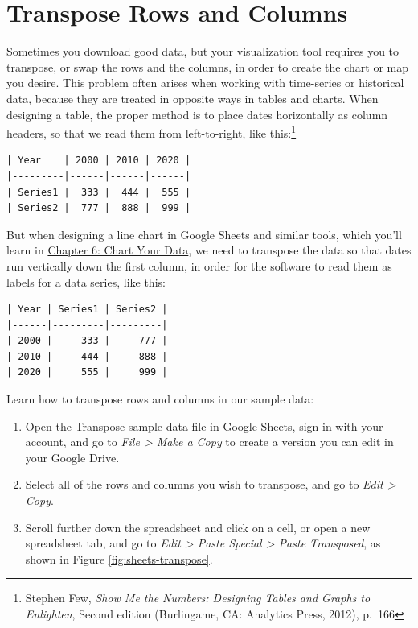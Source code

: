 \documentclass[
  english,
]{book}
\begin{document}
\hypertarget{transpose}{%
\section*{Transpose Rows and Columns}\label{transpose}}

Sometimes you download good data, but your visualization tool requires you to transpose, or swap the rows and the columns, in order to create the chart or map you desire. This problem often arises when working with time-series or historical data, because they are treated in opposite ways in tables and charts. When designing a table, the proper method is to place dates horizontally as column headers, so that we read them from left-to-right, like this:\footnote{Stephen Few, \emph{Show {Me} the {Numbers}: {Designing Tables} and {Graphs} to {Enlighten}}, Second edition ({Burlingame, CA}: {Analytics Press}, 2012), p.~166}

\begin{verbatim}
| Year    | 2000 | 2010 | 2020 |
|---------|------|------|------|
| Series1 |  333 |  444 |  555 |
| Series2 |  777 |  888 |  999 |
\end{verbatim}

But when designing a line chart in Google Sheets and similar tools, which you'll learn in \href{chart.html}{Chapter 6: Chart Your Data}, we need to transpose the data so that dates run vertically down the first column, in order for the software to read them as labels for a data series, like this:

\begin{verbatim}
| Year | Series1 | Series2 |
|------|---------|---------|
| 2000 |     333 |     777 |
| 2010 |     444 |     888 |
| 2020 |     555 |     999 |
\end{verbatim}

Learn how to transpose rows and columns in our sample data:

\begin{enumerate}
\def\labelenumi{\arabic{enumi}.}
\item
  Open the \href{https://docs.google.com/spreadsheets/d/1s7MwJMY_vNkvNNJDAl0HJMO6fzxCNj4eMA5fBZ1pZgU/edit\#gid=0}{Transpose sample data file in Google Sheets}, sign in with your account, and go to \emph{File \textgreater{} Make a Copy} to create a version you can edit in your Google Drive.
\item
  Select all of the rows and columns you wish to transpose, and go to \emph{Edit \textgreater{} Copy}.
\item
  Scroll further down the spreadsheet and click on a cell, or open a new spreadsheet tab, and go to \emph{Edit \textgreater{} Paste Special \textgreater{} Paste Transposed}, as shown in Figure \ref{fig:sheets-transpose}.
\end{enumerate}
\end{document}
